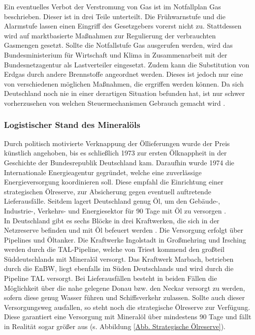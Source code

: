 			Ein eventuelles Verbot der Verstromung von Gas ist im Notfallplan Gas beschrieben.
			Dieser ist in drei Teile unterteilt. 
			Die Frühwarnstufe und die Alarmstufe lassen einen Eingriff des Gesetzgebers vorerst nicht zu. 
			Stattdessen wird auf marktbasierte Maßnahmen zur Regulierung der verbrauchten Gasmengen gesetzt. 			
			Sollte die Notfallstufe Gas ausgerufen werden, wird das Bundesministerium für Wirtschaft und Klima in Zusammenarbeit mit der Bundesnetzagentur als Lastverteiler eingesetzt.
			Zudem kann die Substitution von Erdgas durch andere Brennstoffe angeordnet werden.
			Dieses ist jedoch nur eine von verschiedenen möglichen Maßnahmen, die ergriffen werden können. 
			Da sich Deutschland noch nie in einer derartigen Situation befunden hat, ist nur schwer vorherzusehen von welchen Steuermechanismen Gebrauch gemacht wird \cite{Notfallplan_Gas}.
	
		\subsubsection{Logistischer Stand des Mineralöls}
		
			Durch politisch motivierte Verknappung der Öllieferungen wurde der Preis künstlich angehoben, bis es schließlich 1973 zur ersten Ölknappheit in der Geschichte der Bundesrepublik Deutschland kam.
			Daraufhin wurde 1974 die Internationale Energieagentur gegründet, welche eine zuverlässige Energieversorgung koordinieren soll. 
			Diese empfahl die Einrichtung einer strategischen Ölreserve, zur Absicherung gegen eventuell auftretende Lieferausfälle. 
			Seitdem lagert Deutschland genug Öl, um den Gebäude-, Industrie-, Verkehrs- und Energiesektor für 90 Tage mit Öl zu versorgen \cite{strat_Ölreserve_Geschichte}. \\
			
			In Deutschland gibt es sechs Blöcke in drei Kraftwerken, die sich in der Netzreserve befinden und mit Öl befeuert werden \cite{Excel_Kraftwerksliste}. 
			Die Versorgung erfolgt über Pipelines und Öltanker.
			Die Kraftwerke Ingolstadt in Großmehring und Irsching werden durch die TAL-Pipeline, welche von Triest kommend den großteil Süddeutschlands mit Mineralöl versorgt. 
			Das Kraftwerk Marbach, betrieben durch die EnBW, liegt ebenfalls im Süden Deutschlands und wird durch die Pipeline TAL versorgt. 
			Bei Lieferausfällen besteht in beiden Fällen die Möglichkeit über die nahe gelegene Donau bzw. den Neckar versorgt zu werden, sofern diese genug Wasser führen und Schiffsverkehr zulassen. 
			Sollte auch dieser Versorgungsweg ausfallen, so steht noch die strategische Ölreserve zur Verfügung. 
			Diese garantiert eine Versorgung mit Mineralöl über mindestens 90 Tage und fällt in Realität sogar größer aus (s. Abbildung \ref{Abb. Strategische Ölreserve}).
	
